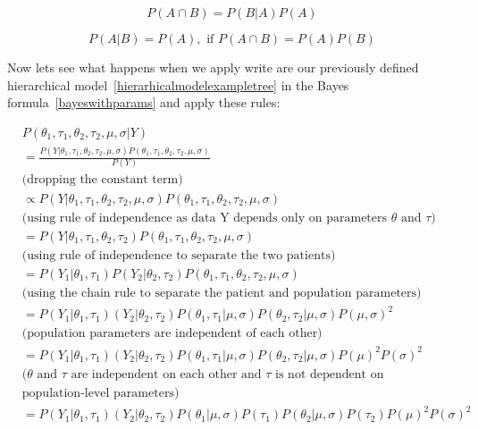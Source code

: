 \documentclass[12pt,a4paper,leqno]{report}
\theoremstyle{plain}
\theoremstyle{definition}
\theoremstyle{remark}
\begin{document}
\begin{equation}\label{chainrule}
    P(A \cap B) = P(B|A)P(A)
\end{equation}

\begin{equation}\label{ruleofindependence}
    P(A|B) = P(A), \text{ if } P(A \cap B) = P(A)P(B)
\end{equation}
\smallskip

Now lets see what happens when we apply write are our previously defined hierarchical
model\ \ref{hierarhicalmodelexampletree} in the Bayes formula\
\ref{bayeswithparams} and apply these rules:

\begin{equation*}\label{}
    \begin{aligned}\label{conjugatebayesrule}
        &P(\theta_1,\tau_1,\theta_2,\tau_2,\mu,\sigma | Y) \\
        &= \frac{P(Y | \theta_1,\tau_1,\theta_2,\tau_2,\mu,\sigma)P(\theta_1,\tau_1,\theta_2,\tau_2,\mu,\sigma)}{P(Y)} \\
        &\text{(dropping the constant term)} \\
        &\propto P(Y | \theta_1,\tau_1,\theta_2,\tau_2,\mu,\sigma)P(\theta_1,\tau_1,\theta_2,\tau_2,\mu,\sigma) \\
        &\text{(using rule of independence as data Y depends only on parameters $\theta$ and $\tau$)} \\
        &= P(Y | \theta_1,\tau_1,\theta_2,\tau_2)P(\theta_1,\tau_1,\theta_2,\tau_2,\mu,\sigma) \\
        &\text{(using rule of independence to separate the two patients)} \\
        &= P(Y_1 | \theta_1,\tau_1)P(Y_2 | \theta_2,\tau_2)P(\theta_1,\tau_1,\theta_2,\tau_2,\mu,\sigma) \\
        &\text{(using the chain rule to separate the patient and population parameters)} \\
        &= P(Y_1|\theta_1,\tau_1)(Y_2|\theta_2, \tau_2)P(\theta_1,\tau_1|\mu,\sigma)P(\theta_2,\tau_2|\mu,\sigma)P(\mu, \sigma)^2 \\
        &\text{(population parameters are independent of each other)} \nonumber \\
        &= P(Y_1|\theta_1,\tau_1)(Y_2|\theta_2, \tau_2)P(\theta_1,\tau_1|\mu,\sigma)P(\theta_2,\tau_2|\mu,\sigma)P(\mu)^2P(\sigma)^2 \\
        &\text{($\theta$ and $\tau$ are independent on each other and $\tau$ is not dependent on} \\
        & \text{population-level parameters)} \\
        &= P(Y_1|\theta_1,\tau_1)(Y_2|\theta_2, \tau_2)P(\theta_1|\mu,\sigma)P(\tau_1)P(\theta_2|\mu,\sigma)P(\tau_2)P(\mu)^2P(\sigma)^2 \nonumber
    \end{aligned}
\end{equation*}
\end{document}
